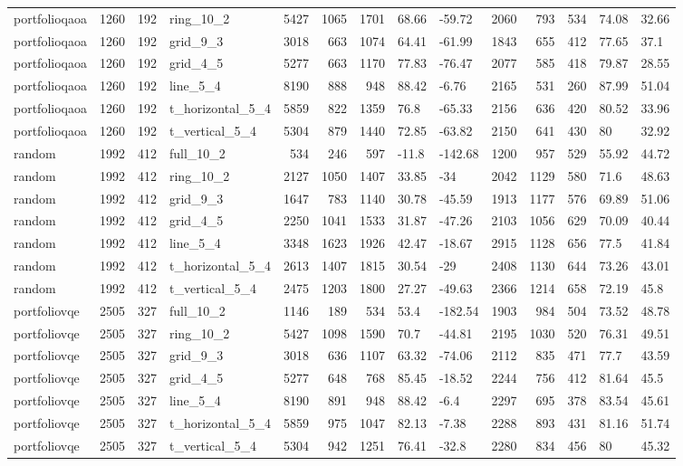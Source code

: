 \begin{longtable}{lrrlrrrllrrrll}
portfolioqaoa & 1260 & 192 & ring\_10\_2 & 5427 & 1065 & 1701 & 68.66 & -59.72 & 2060 & 793 & 534 & 74.08 & 32.66 \\
portfolioqaoa & 1260 & 192 & grid\_9\_3 & 3018 & 663 & 1074 & 64.41 & -61.99 & 1843 & 655 & 412 & 77.65 & 37.1 \\
portfolioqaoa & 1260 & 192 & grid\_4\_5 & 5277 & 663 & 1170 & 77.83 & -76.47 & 2077 & 585 & 418 & 79.87 & 28.55 \\
portfolioqaoa & 1260 & 192 & line\_5\_4 & 8190 & 888 & 948 & 88.42 & -6.76 & 2165 & 531 & 260 & 87.99 & 51.04 \\
portfolioqaoa & 1260 & 192 & t\_horizontal\_5\_4 & 5859 & 822 & 1359 & 76.8 & -65.33 & 2156 & 636 & 420 & 80.52 & 33.96 \\
portfolioqaoa & 1260 & 192 & t\_vertical\_5\_4 & 5304 & 879 & 1440 & 72.85 & -63.82 & 2150 & 641 & 430 & 80 & 32.92 \\
random & 1992 & 412 & full\_10\_2 & 534 & 246 & 597 & -11.8 & -142.68 & 1200 & 957 & 529 & 55.92 & 44.72 \\
random & 1992 & 412 & ring\_10\_2 & 2127 & 1050 & 1407 & 33.85 & -34 & 2042 & 1129 & 580 & 71.6 & 48.63 \\
random & 1992 & 412 & grid\_9\_3 & 1647 & 783 & 1140 & 30.78 & -45.59 & 1913 & 1177 & 576 & 69.89 & 51.06 \\
random & 1992 & 412 & grid\_4\_5 & 2250 & 1041 & 1533 & 31.87 & -47.26 & 2103 & 1056 & 629 & 70.09 & 40.44 \\
random & 1992 & 412 & line\_5\_4 & 3348 & 1623 & 1926 & 42.47 & -18.67 & 2915 & 1128 & 656 & 77.5 & 41.84 \\
random & 1992 & 412 & t\_horizontal\_5\_4 & 2613 & 1407 & 1815 & 30.54 & -29 & 2408 & 1130 & 644 & 73.26 & 43.01 \\
random & 1992 & 412 & t\_vertical\_5\_4 & 2475 & 1203 & 1800 & 27.27 & -49.63 & 2366 & 1214 & 658 & 72.19 & 45.8 \\
portfoliovqe & 2505 & 327 & full\_10\_2 & 1146 & 189 & 534 & 53.4 & -182.54 & 1903 & 984 & 504 & 73.52 & 48.78 \\
portfoliovqe & 2505 & 327 & ring\_10\_2 & 5427 & 1098 & 1590 & 70.7 & -44.81 & 2195 & 1030 & 520 & 76.31 & 49.51 \\
portfoliovqe & 2505 & 327 & grid\_9\_3 & 3018 & 636 & 1107 & 63.32 & -74.06 & 2112 & 835 & 471 & 77.7 & 43.59 \\
portfoliovqe & 2505 & 327 & grid\_4\_5 & 5277 & 648 & 768 & 85.45 & -18.52 & 2244 & 756 & 412 & 81.64 & 45.5 \\
portfoliovqe & 2505 & 327 & line\_5\_4 & 8190 & 891 & 948 & 88.42 & -6.4 & 2297 & 695 & 378 & 83.54 & 45.61 \\
portfoliovqe & 2505 & 327 & t\_horizontal\_5\_4 & 5859 & 975 & 1047 & 82.13 & -7.38 & 2288 & 893 & 431 & 81.16 & 51.74 \\
portfoliovqe & 2505 & 327 & t\_vertical\_5\_4 & 5304 & 942 & 1251 & 76.41 & -32.8 & 2280 & 834 & 456 & 80 & 45.32 \\
\end{longtable}
